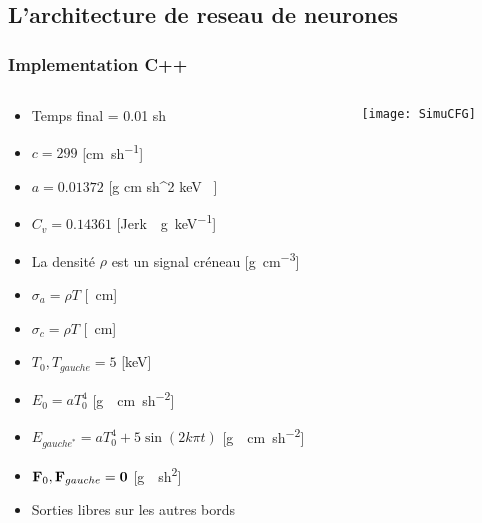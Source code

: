 \subsection{L'architecture de reseau de neurones}

\begin{frame}
  \frametitle{Implementation C++}
  \begin{columns}
    \begin{column}{0.6\textwidth}
      \scriptsize
      \begin{itemize}
        \item Temps final = 0.01 \si{sh} %
        \item $c = 299$ [\si{\cm \per sh}]
        \item $a = 0.01372$ [\si{g \per cm \per sh^2  \per keV }]
        \item $C_v = 0.14361$ [\si{Jerk \per\g \per keV}] %
        \item La densité $\rho$ est un signal créneau [\si{\g\per\cm\cubed}]
        \item $\sigma_a = \rho T$ [\si{\per\cm}]
        \item $\sigma_c = \rho T$ [\si{\per\cm}]
        \item $T_0, T_{gauche} = 5$ [\si{keV}] %
        \item $E_0 = aT_0^4$ [\si{g \per \cm \per sh^2}]
        \item $E_{gauche^*} = aT_{0}^4 + 5 \sin (2 k \pi t)$ [\si{g \per \cm \per sh^2}]
        \item $\mathbf{F}_0, \mathbf{F}_{gauche} = \mathbf{0}$ [\si{g \per sh^2}]
        \item Sorties libres sur les autres bords
      \end{itemize}
    \end{column}
    \begin{column}{0.4\textwidth}
        \texttt{[image: SimuCFG]}   %
    \end{column}
   \end{columns}
\end{frame}



% 
